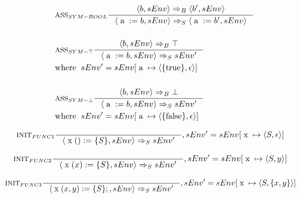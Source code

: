 \begin{align*}
&\inference[$\text{ASS}_{SYM-BOOL}$]{\Braket{b,sEnv} \Rightarrow_B \Braket{b',sEnv}}
                         {\Braket{\Ta := b,sEnv} \Rightarrow_S \Braket{\Ta := b',sEnv}}
\\\\
&\inference[$\text{ASS}_{SYM-\top}$]{\Braket{b,sEnv} \Rightarrow_B \top}
                         {\Braket{\Ta := b,sEnv} \Rightarrow_S sEnv'}
\\
&{\Twhere sEnv' = sEnv[\Ta \mapsto \Braket{\{\Ttrue\},\epsilon}]}
\\\\
&\inference[$\text{ASS}_{SYM-\bot}$]{\Braket{b,sEnv} \Rightarrow_B \bot}
                         {\Braket{\Ta := b,sEnv} \Rightarrow_S sEnv'}
\\
&{\Twhere sEnv' = sEnv[\Ta \mapsto \Braket{\{\Tfalse\},\epsilon}]}
\end{align*}

\begin{align*}
&\inference[$\text{INIT}_{FUNC1}$]{}
                         {\Braket{\Tx() := \{S\},sEnv} \Rightarrow_S sEnv'}
												 {, sEnv' = sEnv[\Tx \mapsto \Braket{S,\epsilon}]}
\end{align*}

\begin{align*}
&\inference[$\text{INIT}_{FUNC2}$]{}
                         {\Braket{\Tx(x) := \{S\},sEnv} \Rightarrow_S sEnv'}
												 {, sEnv' = sEnv[\Tx \mapsto \Braket{S,y}]}
\end{align*} 

\begin{align*}
&\inference[$\text{INIT}_{FUNC3}$]{}
                         {\Braket{\Tx(x,y) := \{S\};,sEnv} \Rightarrow_S sEnv'}
												 {, sEnv' = sEnv[\Tx \mapsto \Braket{S,\{x,y\}}]}
\end{align*}

